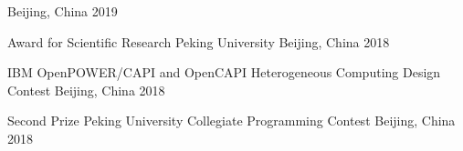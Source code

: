 

\begin{cvhonors}

    {} %
    {Beijing, China} %
    {2019} %

  \cvhonor
    {Award for Scientific Research} %
    {Peking University} %
    {Beijing, China} %
    {2018} %

    {IBM OpenPOWER/CAPI and OpenCAPI Heterogeneous Computing Design Contest} %
    {Beijing, China} %
    {2018} %

  \cvhonor
    {Second Prize} %
    {Peking University Collegiate Programming Contest} %
    {Beijing, China} %
    {2018} %
\end{cvhonors}
